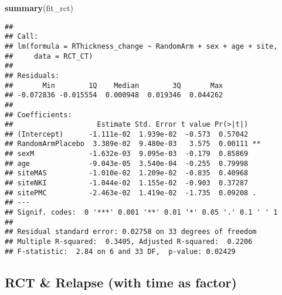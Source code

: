 \documentclass[]{article}
\newenvironment{Shaded}{\begin{snugshade}}{\end{snugshade}}
\newcommand{\KeywordTok}[1]{\textcolor[rgb]{0.13,0.29,0.53}{\textbf{#1}}}
\newcommand{\DataTypeTok}[1]{\textcolor[rgb]{0.13,0.29,0.53}{#1}}
\newcommand{\DecValTok}[1]{\textcolor[rgb]{0.00,0.00,0.81}{#1}}
\newcommand{\StringTok}[1]{\textcolor[rgb]{0.31,0.60,0.02}{#1}}
\newcommand{\CommentTok}[1]{\textcolor[rgb]{0.56,0.35,0.01}{\textit{#1}}}
\newcommand{\OperatorTok}[1]{\textcolor[rgb]{0.81,0.36,0.00}{\textbf{#1}}}
\newcommand{\NormalTok}[1]{#1}
\theoremstyle{definition}
\theoremstyle{definition}
\theoremstyle{definition}
\theoremstyle{remark}
\begin{document}
\begin{Shaded}
\begin{Highlighting}[]
  \KeywordTok{summary}\NormalTok{(fit_rct)}
\end{Highlighting}
\end{Shaded}

\begin{verbatim}
## 
## Call:
## lm(formula = RThickness_change ~ RandomArm + sex + age + site, 
##     data = RCT_CT)
## 
## Residuals:
##       Min        1Q    Median        3Q       Max 
## -0.072836 -0.015554  0.000948  0.019346  0.044262 
## 
## Coefficients:
##                    Estimate Std. Error t value Pr(>|t|)   
## (Intercept)      -1.111e-02  1.939e-02  -0.573  0.57042   
## RandomArmPlacebo  3.389e-02  9.480e-03   3.575  0.00111 **
## sexM             -1.632e-03  9.095e-03  -0.179  0.85869   
## age              -9.043e-05  3.540e-04  -0.255  0.79998   
## siteMAS          -1.010e-02  1.209e-02  -0.835  0.40968   
## siteNKI          -1.044e-02  1.155e-02  -0.903  0.37287   
## sitePMC          -2.463e-02  1.419e-02  -1.735  0.09208 . 
## ---
## Signif. codes:  0 '***' 0.001 '**' 0.01 '*' 0.05 '.' 0.1 ' ' 1
## 
## Residual standard error: 0.02758 on 33 degrees of freedom
## Multiple R-squared:  0.3405, Adjusted R-squared:  0.2206 
## F-statistic:  2.84 on 6 and 33 DF,  p-value: 0.02429
\end{verbatim}

\subsection{RCT \& Relapse (with time as
factor)}\label{rct-relapse-with-time-as-factor}

\begin{Shaded}
\end{Shaded}
\end{document}
